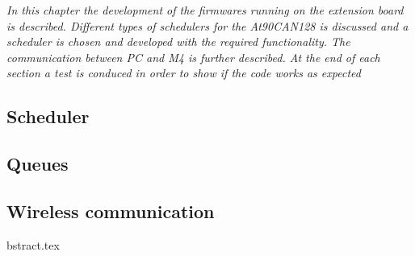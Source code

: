 \textit{In this chapter the development of the firmwares running on the extension board is described. Different types of schedulers for the At90CAN128 is discussed and a scheduler is chosen and developed with the required functionality. The communication between PC and M4 is further described. At the end of each section a test is conduced in order to show if the code works as expected }
\subsection{Scheduler}

\newpage

\subsection{Queues}

\newpage
%

\subsection{Wireless communication}


\newpage
bstract.tex
